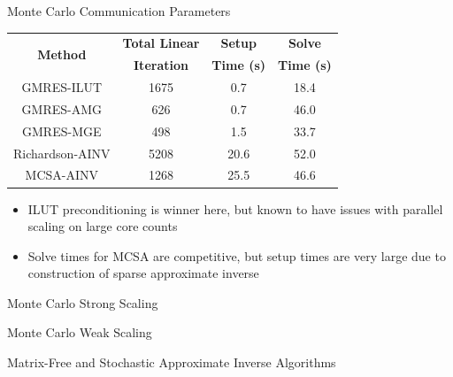 \documentclass{beamer}
\begin{document}
\begin{frame}{Monte Carlo Communication Parameters}
\begin{table}
\centering
\begin{tabular}{cccc}
\toprule
\multirow{2}{*}{\bfseries Method} &
\bfseries Total Linear & \bfseries Setup & \bfseries Solve \\
& \bfseries Iteration & \bfseries Time (s) & \bfseries Time (s) \\
\midrule
GMRES-ILUT      & 1675 & 0.7  & 18.4 \\
GMRES-AMG       & 626  & 0.7  & 46.0 \\
GMRES-MGE       & 498  & 1.5  & 33.7 \\
Richardson-AINV & 5208 & 20.6 & 52.0 \\
MCSA-AINV       & 1268 & 25.5 & 46.6 \\
\bottomrule
\end{tabular}
\end{table}
\begin{itemize}
  \item ILUT preconditioning is winner here, but known to have issues
    with parallel scaling on large core counts
  \item Solve times for MCSA are competitive, but setup times are very large
    due to construction of sparse approximate inverse
\end{itemize}
\end{frame}

\begin{frame}{Monte Carlo Strong Scaling}

  
\end{frame}

\begin{frame}{Monte Carlo Weak Scaling}

  
\end{frame}

\begin{frame}

  \center Matrix-Free and Stochastic Approximate Inverse Algorithms
  
\end{frame}
\end{document}
